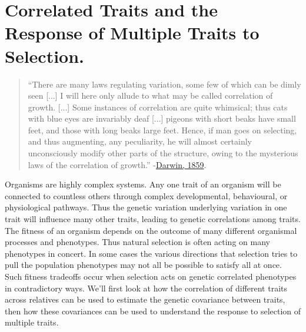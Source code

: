 
\chapter{Correlated Traits and the Response of Multiple Traits to Selection.}

\begin{quote} ``There are many laws regulating variation, some few of
  which can be dimly seen [...] I will here only allude to what may be called correlation of growth. [...] Some instances of correlation are quite whimsical; thus cats with blue eyes are invariably deaf [...] 
 pigeons with short beaks have small feet, and those with long beaks
 large feet. Hence, if man goes on selecting, and thus augmenting, any
 peculiarity, he will almost certainly unconsciously modify other
 parts of the structure, owing to the mysterious laws of the
 correlation of growth.'' -\href{http://darwin-online.org.uk/Variorum/1866/1866-11-c-1859.html}{Darwin, 1859}. \end{quote}


 
Organisms are highly complex systems. Any one trait of an organism will
be connected to countless others through complex
developmental, behavioural, or physiological pathways. Thus the
genetic variation underlying variation in one trait will influence many other
traits, leading to genetic correlations among traits.  The fitness of an organism depends on the outcome of many different
organismal processes and phenotypes. Thus natural selection is often acting on many
phenotypes in concert. In some cases the various directions that selection
tries to pull the population phenotypes may not all be possible to
satisfy all at once. Such fitness tradeoffs occur when selection acts on genetic correlated phenotypes in 
contradictory ways. We'll first look at how the correlation of
different traits across relatives can be used to estimate the genetic
covariance between traits, then how these covariances can be used to
understand the response to selection of multiple traits. 


